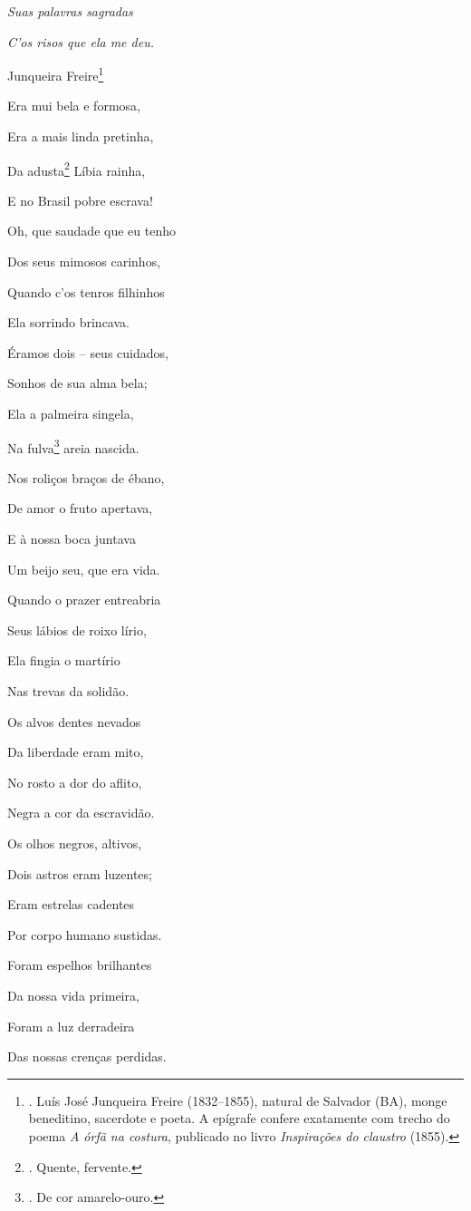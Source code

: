 \emph{Suas palavras sagradas}

\emph{C'os risos que ela me deu.}

Junqueira Freire\footnote{. Luís José Junqueira Freire (1832--1855),
  natural de Salvador (BA), monge beneditino, sacerdote e poeta. A
  epígrafe confere exatamente com trecho do poema \emph{A órfã na
  costura}, publicado no livro \emph{Inspirações do claustro} (1855).}

Era mui bela e formosa,

Era a mais linda pretinha,

Da adusta\footnote{. Quente, fervente.} Líbia rainha,

E no Brasil pobre escrava!

Oh, que saudade que eu tenho

Dos seus mimosos carinhos,

Quando c'os tenros filhinhos

Ela sorrindo brincava.

Éramos dois -- seus cuidados,

Sonhos de sua alma bela;

Ela a palmeira singela,

Na fulva\footnote{. De cor amarelo-ouro.} areia nascida.

Nos roliços braços de ébano,

De amor o fruto apertava,

E à nossa boca juntava

Um beijo seu, que era vida.

Quando o prazer entreabria

Seus lábios de roixo lírio,

Ela fingia o martírio

Nas trevas da solidão.

Os alvos dentes nevados

Da liberdade eram mito,

No rosto a dor do aflito,

Negra a cor da escravidão.

Os olhos negros, altivos,

Dois astros eram luzentes;

Eram estrelas cadentes

Por corpo humano sustidas.

Foram espelhos brilhantes

Da nossa vida primeira,

Foram a luz derradeira

Das nossas crenças perdidas.

